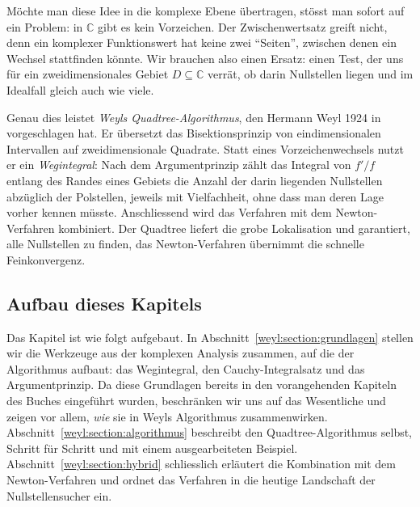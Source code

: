 

Möchte man diese Idee in die komplexe Ebene übertragen, stösst man sofort auf ein
Problem: in $\mathbb{C}$ gibt es kein Vorzeichen.
Der Zwischenwertsatz greift nicht, denn ein komplexer Funktionswert hat keine zwei
%
``Seiten'', zwischen denen ein Wechsel stattfinden könnte.
Wir brauchen also einen Ersatz: einen Test, der uns für ein zweidimensionales Gebiet
$D \subseteq \mathbb{C}$ verrät, ob darin Nullstellen liegen und im Idealfall
gleich auch wie viele.

Genau dies leistet \emph{Weyls Quadtree-Algorithmus}, den Hermann Weyl 1924 in
\cite{weyl:weyl1924} vorgeschlagen hat.
%
Er übersetzt das Bisektionsprinzip von eindimensionalen Intervallen auf
zweidimensionale Quadrate.
Statt eines Vorzeichenwechsels nutzt er ein \emph{Wegintegral}: Nach dem
Argumentprinzip zählt das Integral von \(f'/f\) entlang des Randes eines Gebiets die
%
Anzahl der darin liegenden Nullstellen abzüglich der Polstellen, jeweils mit
Vielfachheit, ohne dass man deren Lage vorher kennen müsste.
Anschliessend wird das Verfahren mit dem Newton-Verfahren kombiniert. Der Quadtree
liefert die grobe Lokalisation und garantiert, alle Nullstellen zu finden, das
Newton-Verfahren übernimmt die schnelle Feinkonvergenz.

\subsection{Aufbau dieses Kapitels%
\label{weyl:subsection:aufbau}}
Das Kapitel ist wie folgt aufgebaut.
In Abschnitt~\ref{weyl:section:grundlagen} stellen wir die Werkzeuge aus der komplexen
Analysis zusammen, auf die der Algorithmus aufbaut: das Wegintegral, den Cauchy-Integralsatz und das Argumentprinzip.
Da diese Grundlagen bereits in den vorangehenden Kapiteln des Buches eingeführt wurden,
beschränken wir uns auf das Wesentliche und zeigen vor allem, \emph{wie} sie in
Weyls Algorithmus zusammenwirken.
Abschnitt~\ref{weyl:section:algorithmus} beschreibt den Quadtree-Algorithmus
selbst, Schritt für Schritt und mit einem ausgearbeiteten Beispiel.
Abschnitt~\ref{weyl:section:hybrid} schliesslich erläutert die Kombination mit dem
Newton-Verfahren und ordnet das Verfahren in die heutige Landschaft der
Nullstellensucher ein.
%

